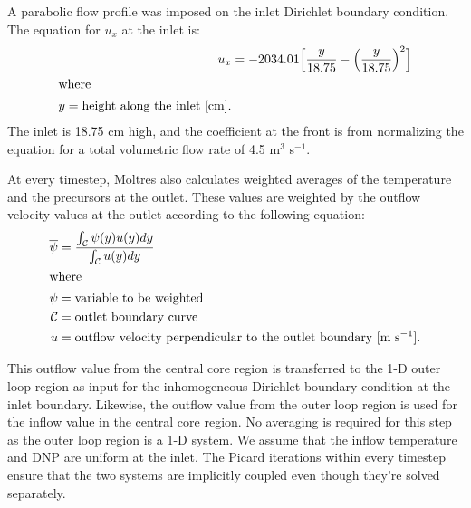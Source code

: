 A parabolic flow profile was imposed on the inlet Dirichlet boundary
condition. The equation for $u_x$ at the inlet is:
%
\begin{align}
    u_x &= -2034.01 \Big[\frac{y}{18.75} - \Big(\frac{y}{18.75}\Big)^2 
    \Big] \\
    \intertext{where}
    y = \text{height along the inlet [cm].}
\end{align}
%
The inlet is 18.75 cm high, and the coefficient at the front is from
normalizing the equation for a total volumetric flow rate of
4.5 m$^3$ s$^{-1}$.

At every timestep, Moltres also calculates weighted averages of the
temperature and the precursors at the outlet. These values are weighted by the
outflow velocity values at the outlet according to the following equation:
%
\begin{align}
    \overline{\psi} &= \frac{\int_\mathcal{C} \psi(y) u(y) dy}{
    \int_\mathcal{C} u(y) dy} \\
    \intertext{where}
    \psi &= \text{variable to be weighted} \nonumber \\
    \mathcal{C} &= \text{outlet boundary curve} \nonumber \\
    u &= \text{outflow velocity perpendicular to the outlet boundary [m
    s$^{-1}$].} \nonumber
\end{align}

This outflow value from the central core region is transferred to the 1-D
outer loop region as input for the inhomogeneous Dirichlet boundary
condition at the inlet boundary. Likewise, the outflow value from the outer
loop region is used for the inflow value in the central core region. No
averaging is required for this step as the outer loop region is a 1-D system.
We assume that the inflow temperature and \gls{DNP} are uniform at the inlet.
The Picard iterations within every timestep ensure that the two systems are
implicitly coupled even though they're solved separately.
